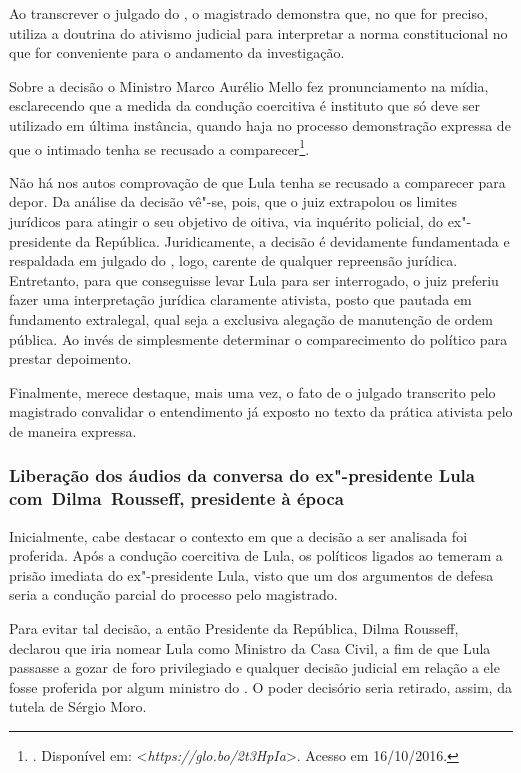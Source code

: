 Ao transcrever o julgado do , o magistrado demonstra que, no que
for preciso, utiliza a doutrina do ativismo judicial para interpretar a
norma constitucional no que for conveniente para o andamento da
investigação.

Sobre a decisão o Ministro Marco Aurélio Mello fez pronunciamento
na mídia, esclarecendo que a medida da condução coercitiva é instituto
que só deve ser utilizado em última instância, quando haja no processo
demonstração expressa de que o intimado tenha se recusado a
comparecer\footnote{. Disponível em: \textless{}\emph{https://glo.bo/2t3HpIa}\textgreater{}.
Acesso em 16/10/2016.}.

Não há nos autos comprovação de que Lula tenha se recusado a
comparecer para depor. Da análise da decisão vê"-se, pois, que o juiz
extrapolou os limites jurídicos para atingir o seu objetivo de oitiva,
via inquérito policial, do ex"-presidente da República. Juridicamente, a
decisão é devidamente fundamentada e respaldada em julgado do , logo,
carente de qualquer repreensão jurídica. Entretanto, para que
conseguisse levar Lula para ser interrogado, o juiz preferiu fazer uma
interpretação jurídica claramente ativista, posto que pautada em
fundamento extralegal, qual seja a exclusiva alegação de manutenção de
ordem pública. Ao invés de simplesmente determinar o comparecimento do
político para prestar depoimento.

Finalmente, merece destaque, mais uma vez, o fato de o julgado
transcrito pelo magistrado convalidar o entendimento já exposto no texto
da prática ativista pelo  de maneira expressa.

\subsubsection{Liberação dos áudios da conversa do ex"-presidente Lula
com~Dilma~Rousseff, presidente à época}

Inicialmente, cabe destacar o contexto em que a decisão a ser analisada
foi proferida. Após a condução coercitiva de Lula, os políticos ligados
ao  temeram a prisão imediata do ex"-presidente Lula, visto que um dos
argumentos de defesa seria a condução parcial do processo pelo
magistrado.

Para evitar tal decisão, a então Presidente da República, Dilma Rousseff,
declarou que iria nomear Lula como Ministro da Casa Civil, a fim de que
Lula passasse a gozar de foro privilegiado e qualquer decisão judicial
em relação a ele fosse proferida por algum ministro do . O poder
decisório seria retirado, assim, da tutela de Sérgio Moro.

